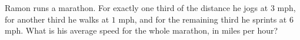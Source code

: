 Ramon runs a marathon. For exactly one third of the distance he jogs at $3$ mph, for another third he walks at $1$ mph, and for the remaining third he sprints at $6$ mph. What is his average speed for the whole marathon, in miles per hour?
